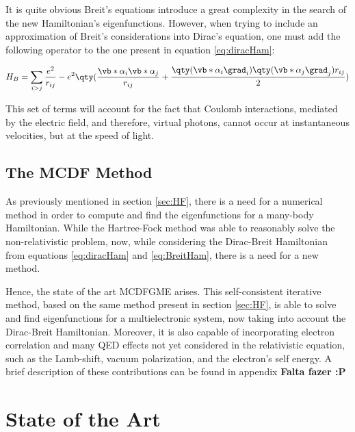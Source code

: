   It is quite obvious Breit's equations introduce a great complexity in the search of the new Hamiltonian's eigenfunctions. However, when trying to include an approximation of Breit's considerations into Dirac's equation, one must add the following operator to the one present in equation \eqref{eq:diracHam}:

  \begin{equation}
    H_B = \sum_{i>j}\frac{e^2}{r_{ij}} - e^2\qty(\frac{\vb*{\alpha}_i\vb*{\alpha}_j}{r_{ij}}+\frac{\qty(\vb*{\alpha}_i \grad_i)\qty(\vb*{\alpha}_j \grad_j)r_{ij}}{2})  
    \label{eq:BreitHam}
  \end{equation}

This set of terms will account for the fact that Coulomb interactions, mediated by the electric field, and therefore, \gls{virtual photons}, cannot occur at instantaneous velocities, but at the speed of light.

\subsection{The \gls{MCDF} Method}

As previously mentioned in section \ref{sec:HF}, there is a need for a numerical method in order to compute and find the eigenfunctions for a many-body Hamiltonian. While the Hartree-Fock method was able to reasonably solve the non-relativistic problem, now, while considering the Dirac-Breit Hamiltonian from equations \eqref{eq:diracHam} and \eqref{eq:BreitHam}, there is a need for a new method.

Hence, the state of the art \gls{MCDFGME} arises. This self-consistent iterative method, based on the same method present in section \ref{sec:HF}, is able to solve and find eigenfunctions for a multielectronic system, now taking into account the Dirac-Breit Hamiltonian. Moreover, it is also capable of incorporating electron correlation and many QED effects not yet considered in the relativistic equation, such as the Lamb-shift, vacuum polarization, and the electron's self energy.
A brief description of these contributions can be found in  appendix \textbf{Falta fazer :P}




\section{State of the Art}


